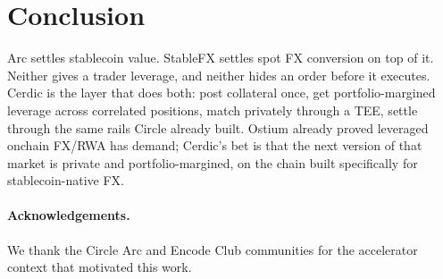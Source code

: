 \documentclass[11pt,a4paper]{article}
\begin{document}
\section{Conclusion}
\label{sec:conclusion}

Arc settles stablecoin value. StableFX settles spot FX conversion on top of it. Neither gives a trader leverage, and neither hides an order before it executes. Cerdic is the layer that does both: post collateral once, get portfolio-margined leverage across correlated positions, match privately through a TEE, settle through the same rails Circle already built. Ostium already proved leveraged onchain FX/RWA has demand; Cerdic's bet is that the next version of that market is private and portfolio-margined, on the chain built specifically for stablecoin-native FX.

\paragraph{Acknowledgements.} We thank the Circle Arc and Encode Club communities for the accelerator context that motivated this work.



\end{document}
